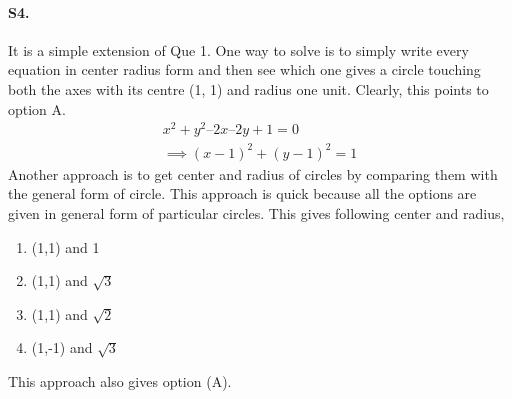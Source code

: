 \documentclass{article}
\begin{document}
\paragraph{S4.} It is a simple extension of Que 1. One way to solve is to simply write every equation in center radius form and then see which one gives a circle touching both the axes with its centre (1, 1) and
radius one unit. Clearly, this points to option A.
\begin{align*}
    x^2 + y^2 – 2x – 2y + 1= 0 \\
    \implies (x-1)^2+(y-1)^2=1
\end{align*}
Another approach is to get center and radius of circles by comparing them with the general form of circle. This approach is quick because all the options are given in general form of particular circles. This gives following center and radius,
\begin{enumerate}
    \item (1,1) and 1
    \item (1,1) and $\sqrt{3}$
    \item (1,1) and $\sqrt{2}$
    \item (1,-1) and $\sqrt{3}$ 
\end{enumerate}
This approach also gives option (A).
\end{document}
